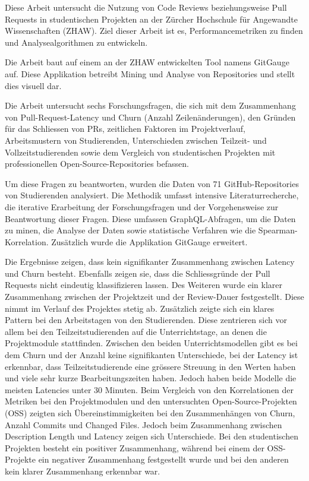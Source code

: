 \begin{extraAbstract}
\addchaptertocentry{\extraabstractname} %
Diese Arbeit untersucht die Nutzung von Code Reviews beziehungsweise Pull Requests in studentischen Projekten an der Zürcher Hochschule für Angewandte Wissenschaften (ZHAW). Ziel dieser Arbeit ist es, Performancemetriken zu finden und  Analysealgorithmen zu entwickeln. 

Die Arbeit baut auf einem an der ZHAW entwickelten Tool namens GitGauge auf. Diese Applikation betreibt Mining und Analyse von Repositories und stellt dies visuell dar.

 Die Arbeit untersucht sechs Forschungsfragen, die sich mit dem Zusammenhang von Pull-Request-Latency und Churn (Anzahl Zeilenänderungen), den Gründen für das Schliessen von PRs, zeitlichen Faktoren im Projektverlauf, Arbeitsmustern von Studierenden, Unterschieden zwischen Teilzeit- und Vollzeitstudierenden sowie dem Vergleich von studentischen Projekten mit professionellen Open-Source-Repositories befassen.

 Um diese Fragen zu beantworten, wurden die Daten von 71 GitHub-Repositories von Studierenden analysiert. Die Methodik umfasst intensive Literaturrecherche, die iterative Erarbeitung der Forschungsfragen und der Vorgehensweise zur Beantwortung dieser Fragen. Diese umfassen GraphQL-Abfragen, um die Daten zu minen, die Analyse der Daten sowie statistische Verfahren wie die Spearman-Korrelation. Zusätzlich wurde die Applikation GitGauge erweitert.
 

 Die Ergebnisse zeigen, dass kein signifikanter Zusammenhang zwischen Latency und Churn besteht. Ebenfalls zeigen sie, dass die Schliessgründe der Pull Requests nicht eindeutig klassifizieren lassen. Des Weiteren wurde ein klarer Zusammenhang zwischen der Projektzeit und der Review-Dauer festgestellt. Diese nimmt im Verlauf des Projektes stetig ab. Zusätzlich zeigte sich ein klares Pattern bei den Arbeitstagen von den Studierenden. Diese zentrieren sich vor allem bei den Teilzeitstudierenden auf die Unterrichtstage, an denen die Projektmodule stattfinden. Zwischen den beiden Unterrichtsmodellen gibt es bei dem Churn und der Anzahl keine signifikanten Unterschiede, bei der Latency ist erkennbar, dass Teilzeitstudierende eine grössere Streuung in den Werten haben und viele sehr kurze Bearbeitungszeiten haben. Jedoch haben beide Modelle die meisten Latencies unter 30 Minuten.
 Beim Vergleich von den Korrelationen der Metriken bei den Projektmodulen und den untersuchten Open-Source-Projekten (OSS) zeigten sich Übereinstimmigkeiten bei den Zusammenhängen von Churn, Anzahl Commits und Changed Files. Jedoch beim Zusammenhang zwischen Description Length und Latency zeigen sich Unterschiede. Bei den studentischen Projekten besteht ein positiver Zusammenhang, während bei einem der OSS-Projekte ein negativer Zusammenhang festgestellt wurde und bei den anderen kein klarer Zusammenhang erkennbar war. 
 

\end{extraAbstract}
